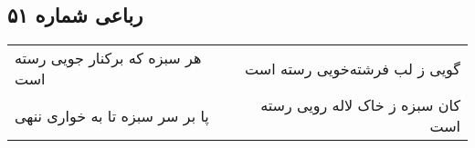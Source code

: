\begin{center}
\section*{رباعی شماره ۵۱}
\label{sec:sh051}
\begin{longtable}{l p{0.5cm} r}
هر سبزه که برکنار جویی رسته است
&&
گویی ز لب فرشته‌خویی رسته است
\\
پا بر سر سبزه تا به خواری ننهی
&&
کان سبزه ز خاک لاله رویی رسته است
\\
\end{longtable}
\end{center}
